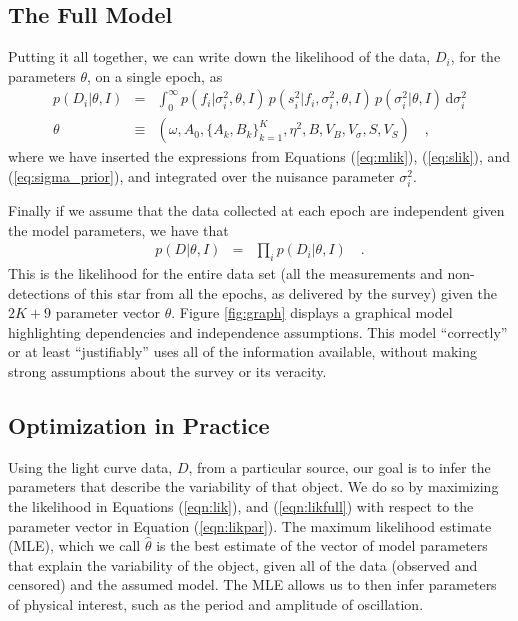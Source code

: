 \documentclass[12pt,preprint]{aastex}
\newcommand{\dd}{\mathrm{d}}
\newcommand{\fobs}{f_i}
\newcommand{\sobs}{s^2_i}
\begin{document}
\subsection{The Full Model}
\label{sec:full}
Putting it all together, we can write down the likelihood of the data, $D_i$, for the parameters $\theta$, on a single epoch, as
\begin{eqnarray}\displaystyle
\label{eqn:lik}
p(D_i|\theta,I) &=& \int_0^{\infty} p(\fobs |\sigma^2_i,\theta,I)\, p(\sobs | \fobs, \sigma^2_i,\theta,I)\, p(\sigma^2_i | \theta, I)\,\dd \sigma^2_i
\\
\label{eqn:likpar}
\theta &\equiv& (\omega, A_0, \{A_k, B_k\}_{k=1}^K, \eta^2, B, V_B, V_{\sigma}, S, V_S) \quad ,
\end{eqnarray}
where we have inserted the expressions from Equations (\ref{eq:mlik}), (\ref{eq:slik}), and (\ref{eq:sigma_prior}), and integrated over the nuisance parameter $\sigma^2_i$.

Finally if we assume that the data collected at each epoch are independent given the model parameters, we have that
\begin{eqnarray}\displaystyle
\label{eqn:likfull}
p(D|\theta,I) &=& \prod_i p(D_i|\theta,I)
\quad.
\end{eqnarray}
This is the likelihood for the entire
data set (all the measurements and non-detections of this star from
all the epochs, as delivered by the survey) given the $2K + 9$ parameter vector $\theta$.
Figure \ref{fig:graph} displays a graphical model highlighting dependencies and 
independence assumptions. This model
``correctly'' or at least ``justifiably'' uses all of the information
available, without making strong assumptions about the survey or its
veracity.

\subsection{Optimization in Practice}
\label{ss:optim}

Using the light curve data, $D$, from a particular source, our goal is to infer the parameters that describe the variability of that object.  We do so by maximizing the likelihood in Equations (\ref{eqn:lik}), and (\ref{eqn:likfull}) with respect to the parameter vector in Equation (\ref{eqn:likpar}).  The maximum likelihood estimate (MLE), which we call $\widehat{\theta}$ is the best estimate of the vector of model parameters that explain the variability of the object, given all of the data (observed and censored) and the assumed model.  The MLE allows us to then infer parameters of physical interest, such as the period and amplitude of oscillation.
\end{document}

